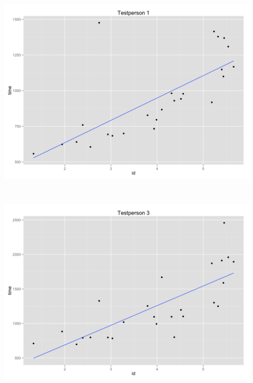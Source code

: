\begin{minipage}{\linewidth}
	\begin{minipage}[b]{.45\linewidth}
		\includegraphics[width=\textwidth]{images/plots/plot_model_test_1}
		\label{fig:testdeltager1}
	\end{minipage}
	\begin{minipage}[b]{0.1\linewidth}
	~
	\end{minipage}
	\begin{minipage}[b]{0.45\linewidth}
		\includegraphics[width=\textwidth]{images/plots/plot_model_test_2}
		\label{fig:testdeltager3}
	\end{minipage}
\end{minipage}

